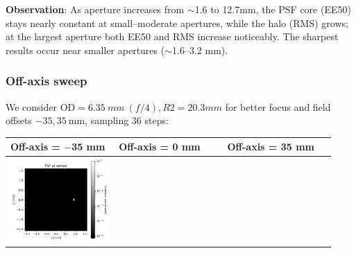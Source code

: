 \documentclass[11pt,a4paper]{article}
\begin{document}
	\textbf{Observation}: As aperture increases from $\sim$1.6 to {12.7}{mm}, the PSF core (EE50) stays nearly constant at small--moderate apertures, while the halo (RMS) grows; at the largest aperture both EE50 and RMS increase noticeably. The sharpest results occur near smaller apertures ($\sim$1.6--3.2 mm).
	
	\subsubsection*{Off-axis sweep}\label{off-axis-sweep}
	
	We consider \(\mathrm{OD}=\SI{6.35}{mm}\ (f/4), R2=20.3mm \) for better focus and field offsets \(-35,  35\ \mathrm{mm}\), sampling 36 steps:
	
	\begin{table}[H]
		\centering
		\begin{tabular}{>{\centering\arraybackslash}m{0.31\linewidth} >{\centering\arraybackslash}m{0.31\linewidth} >{\centering\arraybackslash}m{0.31\linewidth}}
			\toprule
			Off-axis = \(-\)35 mm & Off-axis = 0 mm & Off-axis = 35 mm \\
			\midrule
			\includegraphics[width=\linewidth,keepaspectratio]{offaxis/biconvex_psf_-35.00_log.png} &

\end{tabular}
\end{table}
\end{document}
